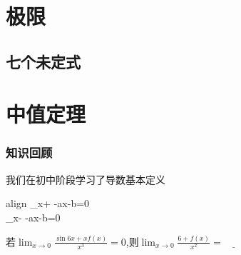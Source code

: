 \documentclass[no-math]{course}
\begin{document}
	\raggedbottom
	\abovedisplayshortskip=5pt
	\belowdisplayshortskip=5pt
	\abovedisplayskip=5pt
	\belowdisplayskip=5pt
	\frontmatter
		\tableofcontents
	\mainmatter
	\chapter{极限}
	\section{七个未定式}
	\chapter{中值定理}
	\begin{paracol}{2}

	\switchcolumn
		\subsection{知识回顾}
			我们在初中阶段学习了导数基本定义
		\begin{empheq}
		[box=\eqmybox]{align}
			\lim_{x\to+\infty} -ax-b=0 \\
			\lim_{x\to-\infty} -ax-b=0
		\end{empheq}


		\begin{examples}
若$\lim_{x\to0}{\frac{\sin{6x}+xf(x)}{x^3}}=0$,则$\lim_{x\to0}{\frac{6+f(x)}{x^2}}=\underline{\qquad}$
	\end{examples}

\end{paracol}
\end{document}
